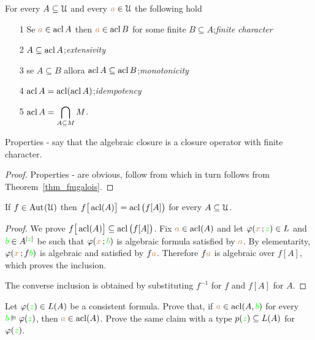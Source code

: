 \begin{corollary}\label{fmacl123} 
For every $A\subseteq\EuScript U$ and every ${\color{brown} a}\in\EuScript U$ the following hold
\begin{itemize}
\item[1]  Se ${\color{brown} a}\in\mathop{\rm acl} A$ then ${\color{brown} a}\in\mathop{\rm acl} B$ for some finite $B\subseteq A$;\hfill\emph{finite character}
\item[2]  $A\subseteq \mathop{\rm acl} A$;\hfill\emph{extensivity}
\item[3]  se $A\subseteq B$ allora $\mathop{\rm acl} A\subseteq \mathop{\rm acl} B$;\hfill\emph{monotonicity}
\item[4]  $\mathop{\rm acl} A=\mathop{\rm acl}(\mathop{\rm acl} A)$;\hfill\emph{idempotency}
\item[5]  $\displaystyle\mathop{\rm acl} A=\bigcap_{A\subseteq M}M$.
\end{itemize} 
\end{corollary}

Properties - say that the algebraic closure is a closure operator with finite character.

\begin{proof}
Properties - are obvious,  follow from  which in turn follows from Theorem~\ref{thm_fmgalois}.
\end{proof}

\begin{proposition}\label{prop_estensionemappechiusuraalgebrica}
If $f\in\textrm{Aut\kern.15ex}(\EuScript U)$ then $f\big[\mathop{\rm acl}(A)\big]=\mathop{\rm acl}\big(f[A]\big)$ for every $A\subseteq\EuScript U$. 
\end{proposition}

\begin{proof}
We prove $f\big[\mathop{\rm acl}(A)\big]\subseteq\mathop{\rm acl}\big(f[A]\big)$. Fix ${\color{brown} a}\in\mathop{\rm acl}(A)$ and let $\varphi({\color{brown} x}\,;{\color{green} z})\in L$ and ${\color{green} b}\in A^{|{\color{green} z}|}$ be such that $\varphi({\color{brown} x}\,;{\color{green} b})$ is algebraic formula satisfied by ${\color{brown} a}$. By elementarity, $\varphi({\color{brown} x}\,;f{\color{green} b})$ is algebraic and satisfied by $f{\color{brown} a}$. Therefore  $f{\color{brown} a}$ is algebraic over $f[A]$, which proves the inclusion.

The converse inclusion is obtained by substituting  $f^{-1}$ for $f$ and $f[A]$ for $A$.
\end{proof}

\begin{exercise}\label{pofu}
Let $\varphi({\color{green} z})\in L(A)$ be a consistent formula. Prove that, if ${\color{brown} a}\in\mathop{\rm acl}(A,{\color{green} b})$ for every ${\color{green} b}\vDash\varphi({\color{green} z})$, then ${\color{brown} a}\in\mathop{\rm acl}(A)$. Prove the same claim with a type $p({\color{green} z})\subseteq L(A)$ for $\varphi({\color{green} z})$.\QED
\end{exercise}


